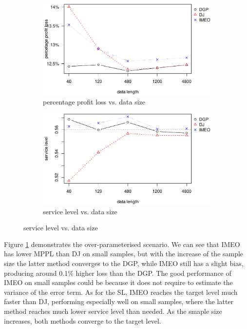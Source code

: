 \documentclass[a4paper,11pt]{article}
\begin{document}
\begin{figure}[ht]
\centering
\caption{Performance vs. sample size with over-parameterised nonlinear model}
\begin{subfigure}[b]{0.48\textwidth}
\centering
\includegraphics[width=\textwidth]{nonSAR(2)(1)_4ppl.pdf}
\caption{percentage profit loss vs. data size}
\end{subfigure}
\hfill
\begin{subfigure}[b]{0.48\textwidth}
\centering
\includegraphics[width=\textwidth]{nonSAR(2)(1)_4sl.pdf}
\caption{service level vs. data size}
\end{subfigure}
\label{fig:misnon_over}
\end{figure}

Figure \ref{fig:misnon_over} demonstrates the over-parameterised scenario. We can see that IMEO has lower MPPL than DJ on small samples, but with the increase of the sample size the latter method converges to the DGP, while IMEO still has a slight bias, producing around 0.1\% higher loss than the DGP. The good performance of IMEO on small samples could be because it does not require to estimate the variance of the error term. As for the SL, IMEO reaches the target level much faster than DJ, performing especially well on small samples, where the latter method reaches much lower service level than needed. As the smaple size increases, both methods converge to the target level.
\end{document}
